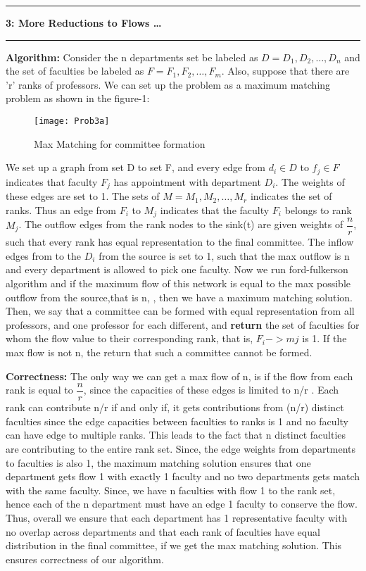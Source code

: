 \documentclass{article}
\newcommand\question[2]{\vspace{.25in}\hrule\textbf{#1: #2}\hrule\vspace{.10in}}
\newcommand\algo{\vspace{.10in}\textbf{Algorithm: }}
\newcommand\correctness{\vspace{.10in}\textbf{Correctness: }}
\begin{document}
   \question{3}{More Reductions to Flows \dots}
   \algo Consider the n departments set be labeled as $D={D_1, D_2, \dots, D_n}$ and the set of faculties be labeled as $F = {F_1, F_2, \dots , F_m}$. Also, suppose that there are 'r' ranks of professors. We can set up the problem as a maximum matching problem as shown in the figure-1: \newline
  \begin{figure}[H]
   \centering
  \texttt{[image: Prob3a]}
  \caption{Max Matching for committee formation}
  \end{figure}
  We set up a graph from set D to set F, and every edge from $d_i \in D$ to $f_j \in F$ indicates that faculty $F_j$ has appointment with department $D_i$. The weights of these edges are set to 1. The sets of $M={M_1, M_2, \dots , M_r}$ indicates the set of ranks. Thus an edge from $F_i$ to $M_j$ indicates that the faculty $F_i$ belongs to rank $M_j$. The outflow edges from the rank nodes to the sink(t) are given weights of $\dfrac{n}{r}$, such that every rank has equal representation to the final committee. The inflow edges from to the $D_i$ from the source is set to 1, such that the max outflow is n and every department is allowed to pick one faculty. Now we run ford-fulkerson algorithm and if the maximum flow of this network is equal to the max possible outflow from the source,that is n, , then we have a maximum matching solution. Then, we say that a committee can be formed with equal representation from all professors, and one professor for each different, and \textbf {return} the set of faculties for whom the flow value to their corresponding rank, that is, $F_i -> mj$ is 1.  If the max flow is not n, the return that such a committee cannot be formed. \newline

  \correctness The only way we can get a max flow of n, is if the flow from each rank is equal to $\dfrac{n}{r}$, since the capacities of these edges is limited to n/r . Each rank can contribute n/r if and only if, it gets contributions from (n/r) distinct faculties since the edge capacities between faculties to ranks is 1 and no faculty can have edge to multiple ranks. This leads to the fact that n distinct faculties are contributing to the entire rank set. Since, the edge weights from departments to faculties is also 1, the maximum matching solution ensures that one department gets flow 1 with exactly 1 faculty and no two departments gets match with the same faculty. Since, we have n faculties with flow 1 to the rank set, hence each of the n department must have an edge 1 faculty to conserve the flow. Thus, overall we ensure that each department has 1 representative faculty with no overlap across departments and that each rank of faculties have equal distribution in the final committee, if we get the max matching solution. This ensures correctness of our algorithm. \newline
\end{document}
